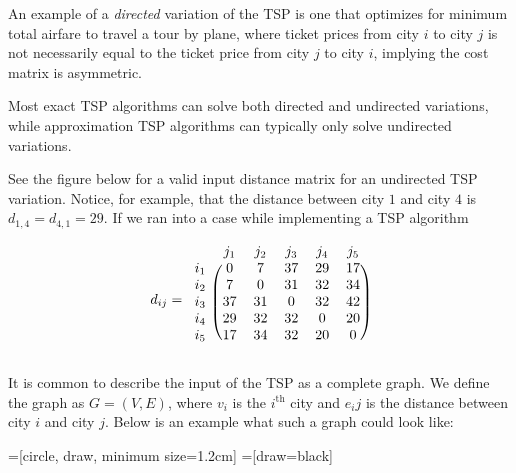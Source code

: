 \documentclass[11pt,fleqn]{article}
\begin{document}
An example of a \textit{directed} variation of the TSP is one that
optimizes for minimum total airfare to travel a tour by plane,
where ticket prices from city $i$ to city $j$ is not necessarily
equal to the ticket price from city $j$ to city $i$, implying the
cost matrix is asymmetric.
\par

Most exact TSP algorithms can solve both directed and undirected variations,
while approximation TSP algorithms can typically only solve undirected
variations.
\par

See the figure below for a valid input distance matrix for an undirected
TSP variation.  Notice, for example, that the distance between city $1$
and city $4$ is $d_{1,4}=d_{4,1}=29$.  If we ran into a case while
implementing a TSP algorithm
\par

\begin{align*}
  d_{ij}=
  \begin{blockarray}{cccccc}
    & j_1 & j_2 & j_3 & j_4 & j_5 \\
  \begin{block}{c(ccccc)}
    i_1 & 0 & 7 & 37 & 29 & 17 \\
    i_2 & 7 & 0 & 31 & 32 & 34 \\
    i_3 & 37 & 31 & 0 & 32 & 42 \\
    i_4 & 29 & 32 & 32 & 0 & 20 \\
    i_5 & 17 & 34 & 32 & 20 & 0 \\
  \end{block}
  \end{blockarray}
\end{align*}

It is common to describe the input of the TSP as a complete graph.
We define the graph as $G=(V,E)$, where $v_i$ is the $i^{\text{th}}$
city and $e_ij$ is the distance between city $i$ and city $j$.  Below
is an example what such a graph could look like:

=[circle, draw, minimum size=1.2cm]
=[draw=black]
\end{document}
